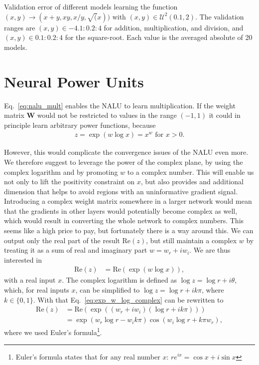 \documentclass[9pt]{article}
\newcommand{\real}{\text{Re}}
\newcommand{\wre}{w_{r}}
\newcommand{\wim}{w_{i}}
\begin{document}
\begin{table}
  \centering
  \caption{Validation error of different models learning the function
  $(x,y)\rightarrow(x+y,xy,x/y,\sqrt(x))$ with $(x,y)\in\mathcal U^2(0.1,2)$.
  The validation ranges are $(x,y) \in -4.1:0.2:4$ for addition, multiplication,
  and division, and $(x,y) \in 0.1:0.2:4$ for the square-root.
  Each value is the averaged absolute of 20 models.
  }
  \label{tab:simple_err}
  
\end{table}





\section{Neural Power Units}%
\label{sec:neural_power_unit}

Eq.~\ref{eq:nalu_mult} enables the NALU to learn multiplication. If the weight
matrix $\bm W$ would not be restricted to values in the range $(-1,1)$ it could
in principle learn arbitrary power functions, because
\begin{align}
  z = \exp(w\log x) = x^w \text{ for } x>0.
\end{align}

However, this would complicate the convergence issues of the NALU even more.
We therefore suggest to leverage the power of the complex plane, by using the
complex logarithm and by promoting $w$ to a complex number.  This will enable
us not only to lift the positivity constraint on $x$, but also provides and
additional dimension that helps to avoid regions with an uninformative gradient
signal.  Introducing a complex
weight matrix somewhere in a larger network would mean that the gradients in
other layers would potentially become complex as well, which would result in
converting the whole network to complex numbers.  This seems like a high price
to pay, but fortunately there is a way around this.  We can output only the
real part of the result $\real(z)$, but still maintain a complex $w$ by
treating it as a sum of real and imaginary part $w=\wre+i\wim$. We are thus
interested in
\begin{align}
  \label{eq:exp_w_log_complex}
  \real(z) &= \real(\exp(w\log x)),
\end{align}
with a real input $x$. The complex logarithm is defined as $\log z=\log r +
i\theta$, which, for real inputs $x$, can be simplified to $\log z = \log r +
ik\pi$, where $k\in \{0,1\}$. With that Eq.~\ref{eq:exp_w_log_complex} can be
rewritten to
\begin{align}
  \real(z) &= \real(\exp((\wre + i\wim) (\log r + ik\pi))) \\
    &= \exp(\wre\log r - \wim k\pi) \cos(\wim\log r + k\pi\wre),
\end{align}
where we used Euler's formula\footnote{Euler's formula states that for any real
number $x$: $re^{ix} = \cos x + i\sin x$}.
\end{document}
